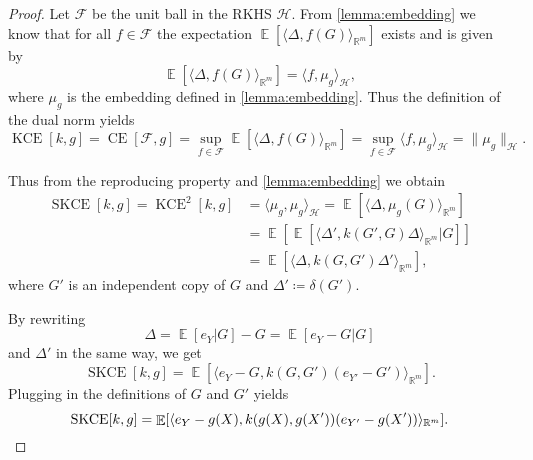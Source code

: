 \documentclass{article}
\DeclareMathOperator{\Expect}{\mathbb{E}}
\DeclareMathOperator{\measure}{CE}
\DeclareMathOperator{\kernelmeasure}{KCE}
\DeclareMathOperator{\squaredkernelmeasure}{SKCE}
\begin{document}
\begin{proof}
  Let $\mathcal{F}$ be the unit ball in the RKHS $\mathcal{H}$. From
  \cref{lemma:embedding} we know that for all $f \in \mathcal{F}$ the
  expectation $\Expect[\langle \Delta, f(G) \rangle_{\mathbb{R}^m}]$ exists and
  is given by
  \begin{equation*}
    \Expect[\langle \Delta, f(G) \rangle_{\mathbb{R}^m}] = \langle f, \mu_g \rangle_{\mathcal{H}},
  \end{equation*}
  where $\mu_g$ is the embedding defined in \cref{lemma:embedding}. Thus the
  definition of the dual norm yields
  \begin{equation*}
    \kernelmeasure[k, g] = \measure[\mathcal{F}, g] = \sup_{f \in \mathcal{F}} \Expect[\langle \Delta, f(G) \rangle_{\mathbb{R}^m}] = \sup_{f \in \mathcal{F}} \langle f, \mu_g \rangle_{\mathcal{H}} = \|\mu_g\|_{\mathcal{H}}.
  \end{equation*}

  Thus from the reproducing property and \cref{lemma:embedding} we obtain
  \begin{equation*}
    \begin{split}
      \squaredkernelmeasure[k, g] = \kernelmeasure^2[k, g] &= \langle \mu_g, \mu_g \rangle_{\mathcal{H}} = \Expect[\langle \Delta, \mu_g(G)\rangle_{\mathbb{R}^m}] \\
      &= \Expect[\Expect[\langle \Delta', k(G', G) \Delta \rangle_{\mathbb{R}^m}| G]] \\
      &= \Expect[\langle \Delta, k(G, G') \Delta' \rangle_{\mathbb{R}^m}],
    \end{split}
  \end{equation*}
  where $G'$ is an independent copy of $G$ and $\Delta' \coloneqq \delta(G')$.

  By rewriting
  \begin{equation*}
    \Delta = \Expect[e_Y | G] - G = \Expect[e_Y - G| G]
  \end{equation*}
  and $\Delta'$ in the same way, we get
  \begin{equation*}
    \squaredkernelmeasure[k, g] = \Expect[\langle e_Y - G, k(G, G') (e_{Y'} - G') \rangle_{\mathbb{R}^m}].
  \end{equation*}
  Plugging in the definitions of $G$ and $G'$ yields
  \begin{equation*}
    \squaredkernelmeasure[k, g] = \Expect[\langle e_Y - g(X), k(g(X), g(X')) (e_{Y'} - g(X')) \rangle_{\mathbb{R}^m}]. \qedhere
  \end{equation*}
\end{proof}
\end{document}
